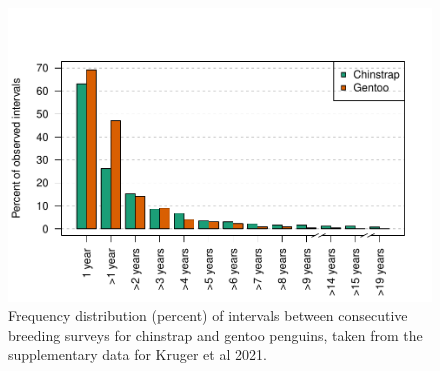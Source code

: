 \documentclass[]{elsarticle} %
\begin{document}
\begin{figure}
\centering
\includegraphics{WattKrug_files/figure-latex/gapCheck-1.pdf}
\caption{Frequency distribution (percent) of intervals between
consecutive breeding surveys for chinstrap and gentoo penguins, taken
from the supplementary data for Kruger et al 2021.}
\end{figure}
\end{document}
